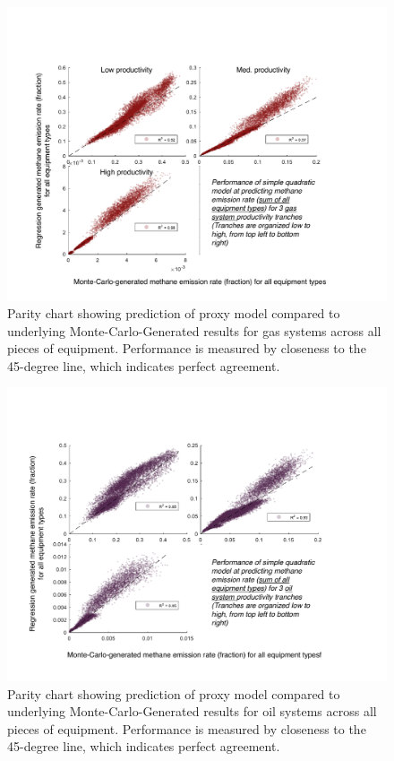 \documentclass[11pt]{report}
\begin{document}
 \begin{figure}[t]
\includegraphics[width=1\columnwidth]{images/ProxyAF_Model_Pic3.pdf}
\caption{Parity chart showing prediction of proxy model compared to underlying Monte-Carlo-Generated results for gas systems across all pieces of equipment. Performance is measured by closeness to the 45-degree line, which indicates perfect agreement.}
\label{fig:AFproxy3}
\end{figure}  

 \begin{figure}[t]
\includegraphics[width=1\columnwidth]{images/ProxyAF_Model_Pic4.pdf}
\caption{Parity chart showing prediction of proxy model compared to underlying Monte-Carlo-Generated results for oil systems across all pieces of equipment. Performance is measured by closeness to the 45-degree line, which indicates perfect agreement.}
\label{fig:AFproxy4}
\end{figure}  
\end{document}
